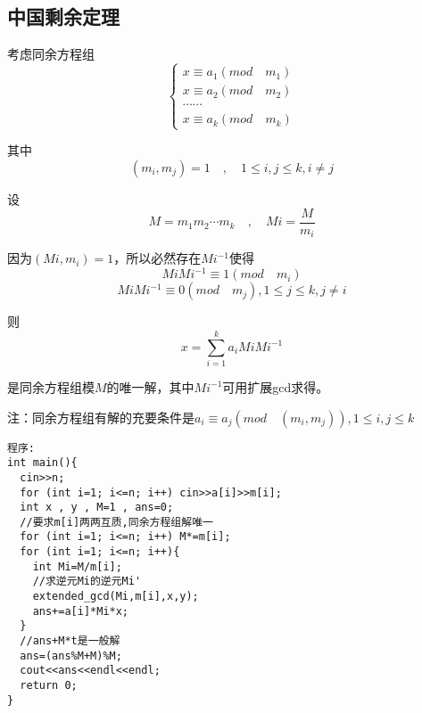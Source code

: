 \subsection{中国剩余定理}

考虑同余方程组
\begin{displaymath}
\left \{ 
    \begin{array}{l}
        x \equiv a_1(mod \quad m_1) \\
        x \equiv a_2(mod \quad m_2) \\
        \cdots \cdots \\
        x \equiv a_k(mod \quad m_k)
    \end{array} 
\right.
\end{displaymath}

其中$$(m_i,m_j)=1 \quad , \quad 1\leq i,j\leq k,i\neq j$$

设
$$M=m_1m_2\cdots m_k \quad , \quad Mi=\frac{M}{m_i}$$

因为$(Mi,m_i)=1$，所以必然存在$Mi^{-1}$使得$$MiMi^{-1} \equiv 1 (mod \quad m_i)$$ $$MiMi^{-1}\equiv 0 (mod \quad m_j),1\leq j \leq k,j\neq i$$


则$$x=\sum_{i=1}^ka_iMiMi^{-1}$$

是同余方程组模$M$的唯一解，其中$Mi^{-1}$可用扩展gcd求得。

注：同余方程组有解的充要条件是$a_i\equiv a_j(mod \quad (m_i,m_j)),1\leq i,j\leq k$

\begin{verbatim}
程序:
int main(){
  cin>>n;
  for (int i=1; i<=n; i++) cin>>a[i]>>m[i];
  int x , y , M=1 , ans=0;
  //要求m[i]两两互质,同余方程组解唯一
  for (int i=1; i<=n; i++) M*=m[i];
  for (int i=1; i<=n; i++){
    int Mi=M/m[i];
    //求逆元Mi的逆元Mi'
    extended_gcd(Mi,m[i],x,y);
    ans+=a[i]*Mi*x;
  }
  //ans+M*t是一般解
  ans=(ans%M+M)%M;
  cout<<ans<<endl<<endl;
  return 0;
}
\end{verbatim}
